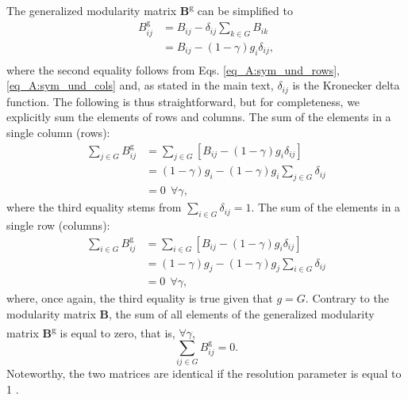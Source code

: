 \documentclass[pdflatex,sn-mathphys-num]{sn-jnl}%
\begin{document}
The generalized modularity matrix \textbf{B}\textsuperscript{g} can be simplified to
\begin{equation} \label{eq_A:gen_mod_full_G}
    \begin{split}
    B^{\text{g}}_{ij} & = B_{ij} - \delta_{ij}\sum_{k \in G} B_{ik} \\
                      & = B_{ij} - (1-\gamma)g_i\delta_{ij}, \\
    \end{split}
\end{equation} where the second equality follows from Eqs. \ref{eq_A:sym_und_rows}, \ref{eq_A:sym_und_cols} and, as stated in the main text, $\delta_{ij}$ is the Kronecker delta function. The following is thus straightforward, but for completeness, we explicitly sum the elements of rows and columns. The sum of the elements in a single column (rows):
\begin{equation}\label{eq_A:gen_sym_und_rows_full_g}
    \begin{split}
    \sum_{j \in G} B^{\text{g}}_{ij} & = \sum_{j \in G} \left[ B_{ij} - (1-\gamma)g_i\delta_{ij} \right ]\\
                                     & = (1-\gamma)g_i - (1-\gamma)g_i \sum_{j \in G} \delta_{ij} \\
                                     & = 0 \ \ \forall \gamma,
    \end{split}
\end{equation} where the third equality stems from $\sum_{i \in G} \delta_{ij}=1$. The sum of the elements in a single row (columns): 
\begin{equation}\label{eq_A:gen_sym_und_cols_full_g}
    \begin{split}
    \sum_{i \in G} B^{\text{g}}_{ij} & = \sum_{i \in G} \left[ B_{ij} - (1-\gamma)g_i\delta_{ij} \right ] \\
                                     & = (1-\gamma)g_j - (1-\gamma)g_j \sum_{i \in G} \delta_{ij} \\
                                     & = 0 \ \ \forall \gamma,
    \end{split}
\end{equation} where, once again, the third equality is true given that $g=G$. Contrary to the modularity matrix \textbf{B}, the sum of all elements of the generalized modularity matrix \textbf{B}\textsuperscript{g} is equal to zero, that is,  $\forall \gamma$,
\begin{equation} \label{eq_A:gen_sym_und_elements_full_g}
    \sum_{ij \in G}B^{\text{g}}_{ij}=0.
\end{equation} Noteworthy, the two matrices are identical if the resolution parameter is equal to 1 \cite{Newman2006}.
\end{document}
